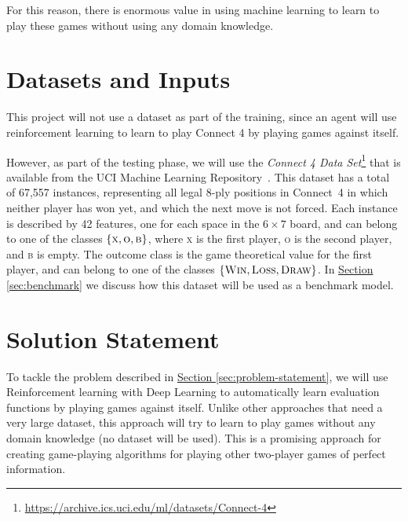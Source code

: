 \documentclass{article}
\begin{document}
For this reason, there is enormous value in using machine learning to learn to play these games without
using any domain knowledge.

\section{Datasets and Inputs}

This project will not use a dataset as part of the training, since an agent will use reinforcement
learning to learn to play Connect 4 by playing games against itself.

However, as part of the testing phase, we will use the \emph{Connect 4 Data
Set}\footnote{\url{https://archive.ics.uci.edu/ml/datasets/Connect-4}} that is available from the
UCI Machine Learning Repository~\citep{Hettich1998UCI}. This dataset has a total of 67,557
instances, representing all legal 8-ply positions in \mbox{Connect 4} in which neither player has
won yet, and which the next move is not forced. Each instance is described by 42 features, one for
each space in the $6 \times 7$ board, and can belong to one of the classes $\{\textsc{x},
\textsc{o}, \textsc{b}\}$, where \textsc{x} is the first player, \textsc{o} is the second player,
and \textsc{b} is empty. The outcome class is the game theoretical value for the first player, and
can belong to one of the classes $\{\textsc{Win}, \textsc{Loss}, \textsc{Draw}\}$. In
\hyperref[sec:benchmark]{Section \ref*{sec:benchmark}} we discuss how this dataset will be used as a
benchmark model.

\section{Solution Statement}

To tackle the problem described in \hyperref[sec:problem-statement]{Section
\ref*{sec:problem-statement}}, we will use Reinforcement learning with Deep Learning to
automatically learn evaluation functions by playing games against itself. Unlike other approaches
that need a very large dataset, this approach will try to learn to play games without any domain
knowledge (no dataset will be used). This is a promising approach for creating game-playing
algorithms for playing other two-player games of perfect information.
\end{document}
